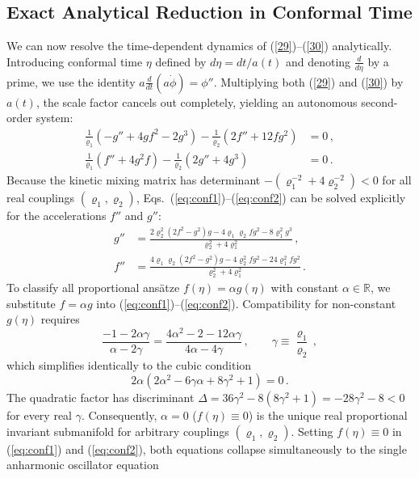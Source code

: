 \documentclass[11pt, a4paper]{article}
\newcommand{\subst}[1]{\textcolor{substantive}{#1}}
\begin{document}
\subst{\subsection{Exact Analytical Reduction in Conformal Time}}

\subst{We can now resolve the time-dependent dynamics of (\ref{29})--(\ref{30}) analytically. Introducing conformal time $\eta$ defined by $d\eta = dt/a(t)$ and denoting $\frac{d}{d\eta}$ by a prime, we use the identity $a\frac{d}{dt}(a\dot{\phi}) = \phi''$. Multiplying both (\ref{29}) and (\ref{30}) by $a(t)$, the scale factor cancels out completely, yielding an autonomous second-order system:}
\begin{align}
\frac{1}{\varrho_1}\left( -g'' + 4gf^2 - 2g^3 \right) - \frac{1}{\varrho_2}\left( 2f'' + 12fg^2 \right) &= 0\,,\label{eq:conf1}\\
\frac{1}{\varrho_1}\left( f'' + 4g^2 f \right) - \frac{1}{\varrho_2}\left( 2g'' + 4g^3 \right) &= 0\,.\label{eq:conf2}
\end{align}
\subst{Because the kinetic mixing matrix has determinant $-\left(\varrho_1^{-2} + 4\varrho_2^{-2}\right) < 0$ for all real couplings $(\varrho_1, \varrho_2)$, Eqs.\ (\ref{eq:conf1})--(\ref{eq:conf2}) can be solved explicitly for the accelerations $f''$ and $g''$:}
\begin{align}
g'' &= \frac{2\varrho_2^2 (2f^2 - g^2)g - 4\varrho_1\varrho_2 f g^2 - 8\varrho_1^2 g^3}{\varrho_2^2 + 4\varrho_1^2}\,,\label{eq:gpp}\\
f'' &= \frac{4\varrho_1\varrho_2 (2f^2 - g^2)g - 4\varrho_2^2 f g^2 - 24\varrho_1^2 f g^2}{\varrho_2^2 + 4\varrho_1^2}\,.\label{eq:fpp}
\end{align}
\subst{To classify all proportional ans\"atze $f(\eta) = \alpha g(\eta)$ with constant $\alpha \in \mathbb{R}$, we substitute $f = \alpha g$ into (\ref{eq:conf1})--(\ref{eq:conf2}). Compatibility for non-constant $g(\eta)$ requires}
\begin{equation}\label{eq:compat}
\frac{-1 - 2\alpha\gamma}{\alpha - 2\gamma} = \frac{4\alpha^2 - 2 - 12\alpha\gamma}{4\alpha - 4\gamma}\,, \qquad \gamma \equiv \frac{\varrho_1}{\varrho_2}\,,
\end{equation}
\subst{which simplifies identically to the cubic condition}
\begin{equation}\label{eq:cubic}
2\alpha\left(2\alpha^2 - 6\gamma\alpha + 8\gamma^2 + 1\right) = 0\,.
\end{equation}
\subst{The quadratic factor has discriminant $\Delta = 36\gamma^2 - 8(8\gamma^2 + 1) = -28\gamma^2 - 8 < 0$ for every real $\gamma$. Consequently, $\alpha = 0$ ($f(\eta) \equiv 0$) is the unique real proportional invariant submanifold for arbitrary couplings $(\varrho_1, \varrho_2)$. Setting $f(\eta) \equiv 0$ in (\ref{eq:conf1}) and (\ref{eq:conf2}), both equations collapse simultaneously to the single anharmonic oscillator equation}
\end{document}
